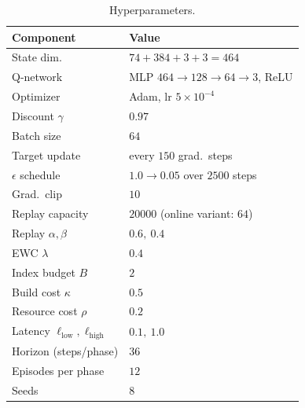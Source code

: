 \begin{table}[t]\centering\small
\caption{Hyperparameters.}
\label{tab:hyper}
\begin{tabular}{ll}
\toprule
Component & Value \\
\midrule
State dim. & $74+384+3+3=464$ \\
Q-network & MLP $464\!\to\!128\!\to\!64\!\to\!3$, ReLU \\
Optimizer & Adam, lr $5\!\times\!10^{-4}$ \\
Discount $\gamma$ & $0.97$ \\
Batch size & $64$ \\
Target update & every $150$ grad.\ steps \\
$\epsilon$ schedule & $1.0\to0.05$ over $2500$ steps \\
Grad.\ clip & $10$ \\
Replay capacity & $20000$ (online variant: $64$) \\
Replay $\alpha,\beta$ & $0.6,\ 0.4$ \\
EWC $\lambda$ & $0.4$ \\
Index budget $B$ & $2$ \\
Build cost $\kappa$ & $0.5$ \\
Resource cost $\rho$ & $0.2$ \\
Latency $\ell_{\text{low}},\ell_{\text{high}}$ & $0.1,\ 1.0$ \\
Horizon (steps/phase) & $36$ \\
Episodes per phase & $12$ \\
Seeds & $8$ \\
\bottomrule
\end{tabular}
\end{table}
